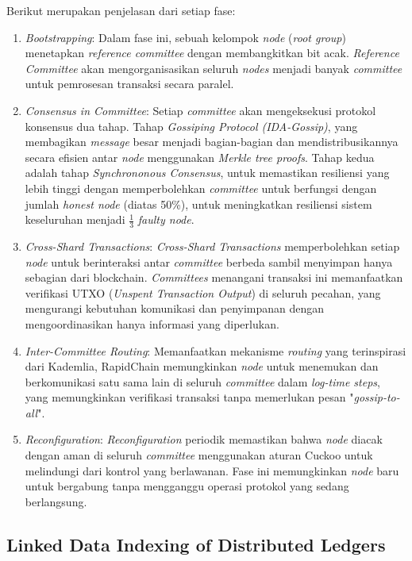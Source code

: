 Berikut merupakan penjelasan dari setiap fase:

\begin{enumerate}
  \item \textit{Bootstrapping}: Dalam fase ini, sebuah kelompok \textit{node} (\textit{root group}) menetapkan \textit{reference committee} dengan membangkitkan bit acak. \textit{Reference Committee} akan mengorganisasikan seluruh \textit{nodes} menjadi banyak \textit{committee} untuk pemrosesan transaksi secara paralel.
  \item \textit{Consensus in Committee}: Setiap \textit{committee} akan mengeksekusi protokol konsensus dua tahap. Tahap \textit{Gossiping Protocol (IDA-Gossip)}, yang membagikan \textit{message} besar menjadi bagian-bagian dan mendistribusikannya secara efisien antar \textit{node} menggunakan \textit{Merkle tree proofs}. Tahap kedua adalah tahap \textit{Synchrononous Consensus}, untuk memastikan resiliensi yang lebih tinggi dengan memperbolehkan \textit{committee} untuk berfungsi dengan jumlah \textit{honest node} (diatas 50\%), untuk meningkatkan resiliensi sistem keseluruhan menjadi $\frac{1}{3}$ \textit{faulty node}. 
  \item \textit{Cross-Shard Transactions}: \textit{Cross-Shard Transactions} memperbolehkan setiap \textit{node} untuk berinteraksi antar \textit{committee} berbeda sambil menyimpan hanya sebagian dari blockchain. \textit{Committees} menangani transaksi ini memanfaatkan verifikasi UTXO (\textit{Unspent Transaction Output}) di seluruh pecahan, yang mengurangi kebutuhan komunikasi dan penyimpanan dengan mengoordinasikan hanya informasi yang diperlukan.
  \item \textit{Inter-Committee Routing}: Memanfaatkan mekanisme \textit{routing} yang terinspirasi dari Kademlia, RapidChain memungkinkan \textit{node} untuk menemukan dan berkomunikasi satu sama lain di seluruh \textit{committee} dalam \textit{log-time steps}, yang memungkinkan verifikasi transaksi tanpa memerlukan pesan "\textit{gossip-to-all}". 
  \item \textit{Reconfiguration}: \textit{Reconfiguration} periodik memastikan bahwa \textit{node} diacak dengan aman di seluruh \textit{committee} menggunakan aturan Cuckoo untuk melindungi dari kontrol yang berlawanan. Fase ini memungkinkan \textit{node} baru untuk bergabung tanpa mengganggu operasi protokol yang sedang berlangsung.
\end{enumerate}

\subsection{Linked Data Indexing of Distributed Ledgers}
\label{subsec:linked-data-indexing-distributed-ledgers}

